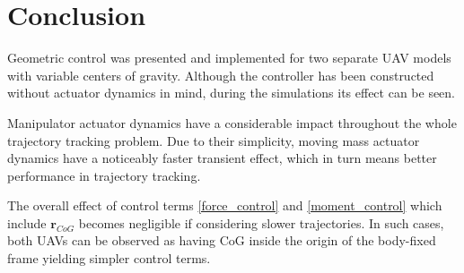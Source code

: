 \section{Conclusion}

Geometric control was presented and implemented for two separate UAV models with variable centers of gravity. Although the controller has been constructed without actuator dynamics in mind, during the simulations its effect can be seen. 

Manipulator actuator dynamics have a considerable impact throughout the whole trajectory tracking problem. Due to their simplicity, moving mass actuator dynamics have a noticeably faster transient effect, which in turn means better performance in trajectory tracking. 

The overall effect of control terms \ref{force_control} and \ref{moment_control} which include $\textbf{r}_{CoG}$ becomes negligible if considering slower trajectories. In such cases, both UAVs can be observed as having CoG inside the origin of the body-fixed frame yielding simpler control terms.
